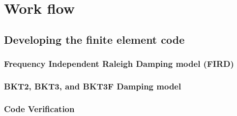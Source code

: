 \newpage
\section{Work flow}
\subsection{Developing the finite element code}


\subsubsection{Frequency Independent Raleigh Damping model (FIRD)}


\subsubsection{BKT2, BKT3, and BKT3F Damping model}


\subsubsection{Code Verification}








